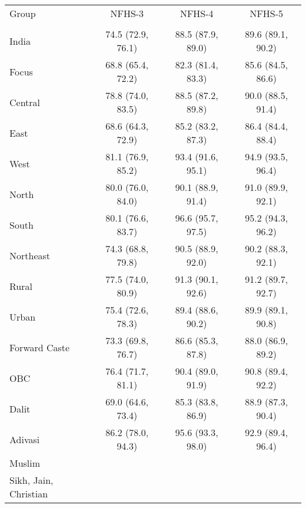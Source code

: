 \begin{tabular}{lccc}
\toprule
Group & NFHS-3 & NFHS-4 & NFHS-5 \\\\
\midrule
India&74.5 (72.9, 76.1)&88.5 (87.9, 89.0)&89.6 (89.1, 90.2)\\
Focus&68.8 (65.4, 72.2)&82.3 (81.4, 83.3)&85.6 (84.5, 86.6)\\
Central&78.8 (74.0, 83.5)&88.5 (87.2, 89.8)&90.0 (88.5, 91.4)\\
East&68.6 (64.3, 72.9)&85.2 (83.2, 87.3)&86.4 (84.4, 88.4)\\
West&81.1 (76.9, 85.2)&93.4 (91.6, 95.1)&94.9 (93.5, 96.4)\\
North&80.0 (76.0, 84.0)&90.1 (88.9, 91.4)&91.0 (89.9, 92.1)\\
South&80.1 (76.6, 83.7)&96.6 (95.7, 97.5)&95.2 (94.3, 96.2)\\
Northeast&74.3 (68.8, 79.8)&90.5 (88.9, 92.0)&90.2 (88.3, 92.1)\\
Rural&77.5 (74.0, 80.9)&91.3 (90.1, 92.6)&91.2 (89.7, 92.7)\\
Urban&75.4 (72.6, 78.3)&89.4 (88.6, 90.2)&89.9 (89.1, 90.8)\\
Forward Caste&73.3 (69.8, 76.7)&86.6 (85.3, 87.8)&88.0 (86.9, 89.2)\\
OBC&76.4 (71.7, 81.1)&90.4 (89.0, 91.9)&90.8 (89.4, 92.2)\\
Dalit&69.0 (64.6, 73.4)&85.3 (83.8, 86.9)&88.9 (87.3, 90.4)\\
Adivasi&86.2 (78.0, 94.3)&95.6 (93.3, 98.0)&92.9 (89.4, 96.4)\\
Muslim&&&\\
Sikh, Jain, Christian&&&\\
\bottomrule
\end{tabular}
